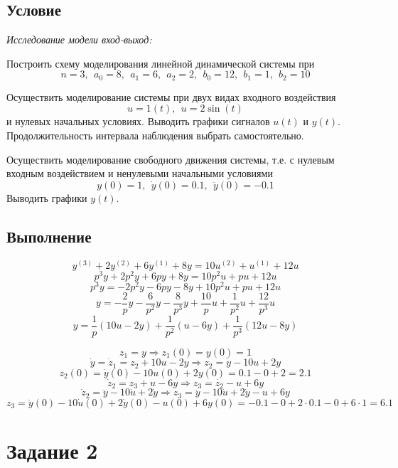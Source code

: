 \documentclass[a4paper, 12pt]{article}
\begin{document}
    \subsection{Условие}
    \textit{Исследование модели вход-выход:}
    \begin{compactitem}
    \item Построить схему моделирования линейной динамической системы при
    $$n=3,\ \ a_0=8,\ \ a_1=6,\ \ a_2=2,\ \ b_0=12,\ \ b_1=1,\ \ b_2=10$$
    \item Осуществить моделирование системы при двух видах входного воздействия
    $$u=1(t),\ \ u=2\sin{(t)}$$ и нулевых начальных условиях. Выводить графики
    сигналов $u(t)$ и $y(t)$. Продолжительность интервала наблюдения выбрать самостоятельно.
    \item Осуществить моделирование свободного движения системы, т.е. с нулевым входным
    воздействием и ненулевыми начальными условиями
    $$y(0)=1,\ \ \dot{y}(0)=0.1,\ \ \ddot{y}(0)=-0.1$$ Выводить графики $y(t)$.
    \end{compactitem}


    \subsection{Выполнение}
    $$y^{(3)}+2y^{(2)}+6y^{(1)}+8y=10u^{(2)}+u^{(1)}+12u$$
    $$p^3y+2p^2y+6py+8y=10p^2u+pu+12u$$
    $$p^3y=-2p^2y-6py-8y+10p^2u+pu+12u$$
    $$y=-\dfrac{2}{p}y-\dfrac{6}{p^2}y-\dfrac{8}{p^3}y+\dfrac{10}{p}u+\dfrac{1}{p^2}u+\dfrac{12}{p^3}u$$
    $$y=\dfrac{1}{p}\left(10u-2y\right)+\dfrac{1}{p^2}\left(u-6y\right)+\dfrac{1}{p^3}\left(12u-8y\right)$$
   
    $$z_1=y\Rightarrow z_1(0)=y(0)=1$$
    $$\dot{y}=\dot{z}_1=z_2+10u-2y\Rightarrow z_2=\dot{y}-10u+2y$$
    $$z_2(0)=\dot{y}(0)-10u(0)+2y(0)=0.1-0+2=2.1$$
    $$\dot{z}_2=z_3+u-6y\Rightarrow z_3=\dot{z_2}-u+6y$$
    $$\dot{z}_2=\ddot{y}-10\dot{u}+2\dot{y}\Rightarrow z_3=\ddot{y}-10\dot{u}+2\dot{y}-u+6y$$
    $$z_3=\ddot{y}(0)-10\dot{u}(0)+2\dot{y}(0)-u(0)+6y(0)=-0.1-0+2\cdot0.1-0+6\cdot1=6.1$$


    \section{Задание 2}
\end{document}
